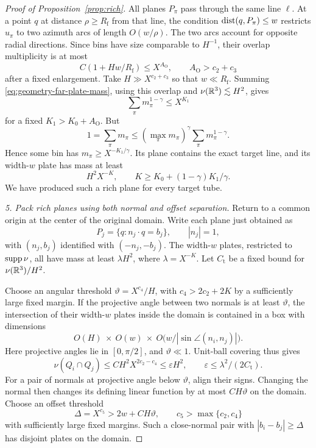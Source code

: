 \begin{proof}[Proof of Proposition~\ref{prop:rich}]
All planes $P_\pi$ pass through the same line $\ell$. At a point
$q$ at distance $\rho\geq R_{\mathrm f}$ from that line, the
condition $\operatorname{dist}(q,P_\pi)\leq w$ restricts $u_\pi$ to two azimuth
arcs of length $O(w/\rho)$. The two arcs account for opposite radial
directions. Since bins have size comparable to $H^{-1}$, their
overlap multiplicity is at most
\[
 C(1+Hw/R_{\mathrm f})\leq X^{A_{\mathrm O}},
 \qquad A_{\mathrm O}>c_2+c_3
\]
after a fixed enlargement. Take $H\gg X^{c_2+c_3}$ so that
$w\ll R_{\mathrm f}$. Summing
\eqref{eq:geometry-far-plate-mass}, using this overlap and
$\nu(\mathbb R^3)\lesssim H^2$, gives
\begin{equation}\label{eq:geometry-bin-concentration}
 \sum_\pi m_\pi^{1-\gamma}\leq X^{K_1}
\end{equation}
for a fixed $K_1>K_0+A_{\mathrm O}$. But
\[
 1=\sum_\pi m_\pi
 \leq (\max_\pi m_\pi)^\gamma
          \sum_\pi m_\pi^{1-\gamma}.
\]
Hence some bin has $m_\pi\geq X^{-K_1/\gamma}$. Its plane contains
the exact target line, and its width-$w$ plate has mass at least
\begin{equation}\label{eq:geometry-rich-plane}
 H^2X^{-K},\qquad
 K\geq K_0+(1-\gamma)K_1/\gamma.
\end{equation}
We have produced such a rich plane for every target tube.

\emph{5. Pack rich planes using both normal and offset separation.}
Return to a common origin at the center of the original domain.
Write each plane just obtained as
\[
 P_j=\{q:n_j\cdot q=b_j\},\qquad |n_j|=1,
\]
with $(n_j,b_j)$ identified with $(-n_j,-b_j)$. The width-$w$
plates, restricted to $\operatorname{supp}\nu$, all have mass at least
$\lambda H^2$, where $\lambda=X^{-K}$. Let
$C_{\mathrm t}$ be a fixed bound for $\nu(\mathbb R^3)/H^2$.

Choose an angular threshold $\vartheta=X^{c_4}/H$, with
$c_4>2c_2+2K$ by a sufficiently large fixed margin. If the
projective angle between two normals is at least $\vartheta$,
the intersection of their width-$w$ plates inside the domain is
contained in a box with dimensions
\[
 O(H)\ \times\ O(w)\ \times\
 O\bigl(w/|\sin\angle(n_i,n_j)|\bigr).
\]
Here projective angles lie in $[0,\pi/2]$, and $\vartheta\ll1$.
Unit-ball covering thus gives
\begin{equation}\label{eq:geometry-plate-intersection}
 \nu(Q_i\cap Q_j)
 \leq C H^2X^{2c_2-c_4}
 \leq \varepsilon H^2,
 \qquad \varepsilon\leq\lambda^2/(2C_{\mathrm t}).
\end{equation}
For a pair of normals at projective angle below $\vartheta$, align
their signs. Changing the normal then changes its defining linear
function by at most $C H\vartheta$ on the domain. Choose an offset
threshold
\begin{equation}\label{eq:geometry-offset-threshold}
 \Delta=X^{c_5}>2w+CH\vartheta,
 \qquad c_5>\max\{c_2,c_4\}
\end{equation}
with sufficiently large fixed margins. Such a close-normal pair
with $|b_i-b_j|\geq\Delta$ has disjoint plates on the domain.


\end{proof}
